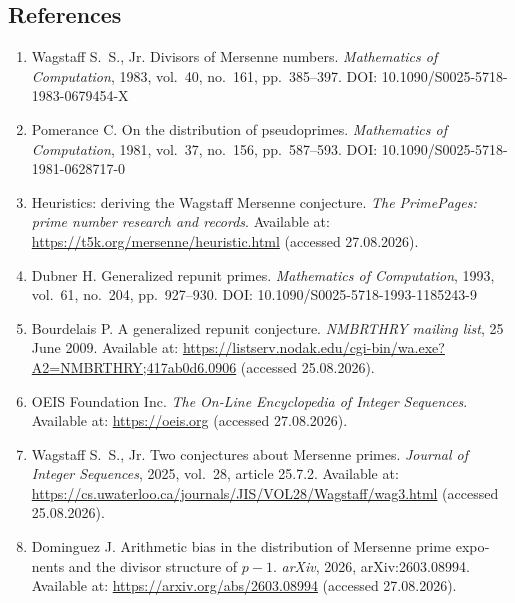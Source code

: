 \documentclass[11pt,a4paper]{article}
\theoremstyle{plain}
\theoremstyle{remark}
\begin{document}
\begin{otherlanguage}{english}
\section*{References}
\begin{enumerate}\itemsep2pt
\item Wagstaff S.~S., Jr. Divisors of Mersenne numbers.
\emph{Mathematics of Computation}, 1983, vol.~40, no.~161, pp.~385--397.
DOI: 10.1090/S0025-5718-1983-0679454-X

\item Pomerance C. On the distribution of pseudoprimes.
\emph{Mathematics of Computation}, 1981, vol.~37, no.~156, pp.~587--593.
DOI: 10.1090/S0025-5718-1981-0628717-0

\item Heuristics: deriving the Wagstaff Mersenne conjecture. \emph{The PrimePages:
prime number research and records}. Available at:
\url{https://t5k.org/mersenne/heuristic.html} (accessed 27.08.2026).

\item Dubner H. Generalized repunit primes.
\emph{Mathematics of Computation}, 1993, vol.~61, no.~204, pp.~927--930.
DOI: 10.1090/S0025-5718-1993-1185243-9

\item Bourdelais P. A generalized repunit conjecture. \emph{NMBRTHRY mailing
list}, 25 June 2009. Available at:
\url{https://listserv.nodak.edu/cgi-bin/wa.exe?A2=NMBRTHRY;417ab0d6.0906}
(accessed 25.08.2026).

\item OEIS Foundation Inc. \emph{The On-Line Encyclopedia of Integer
Sequences}. Available at: \url{https://oeis.org} (accessed 27.08.2026).

\item Wagstaff S.~S., Jr. Two conjectures about Mersenne primes.
\emph{Journal of Integer Sequences}, 2025, vol.~28, article 25.7.2.
Available at:
\url{https://cs.uwaterloo.ca/journals/JIS/VOL28/Wagstaff/wag3.html}
(accessed 25.08.2026).

\item Dominguez J. Arithmetic bias in the distribution of Mersenne prime exponents
and the divisor structure of $p-1$. \emph{arXiv}, 2026, arXiv:2603.08994. Available
at: \url{https://arxiv.org/abs/2603.08994} (accessed 27.08.2026).


\end{enumerate}
\end{otherlanguage}
\end{document}
